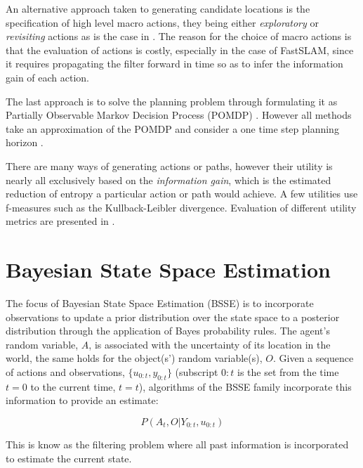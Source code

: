An alternative approach taken to generating candidate locations is the specification of high level macro actions, they being either 
\textit{exploratory} or \textit{revisiting} actions as is the case in \cite{stachniss05robotics}. The reason for the choice of macro actions is that the evaluation
of actions is costly, especially in the case of FastSLAM, since it requires propagating the filter 
forward in time so as to infer the information gain of each action.

The last approach is to solve the planning problem through formulating it as  Partially Observable Markov Decision Process (POMDP) \cite{Ross08onlineplanning}. 
However all methods take an approximation of the POMDP and consider a one time step planning horizon \cite[p.37]{GeorgiosLidoris}.

There are many ways of generating actions or paths, however their utility is nearly all exclusively based on the \textit{information gain}, 
which is the estimated reduction of entropy a particular action or path would achieve. A few utilities use f-measures such as the Kullback-Leibler divergence. 
Evaluation of different utility metrics are presented in \cite{Active_SLAM_Uncertainty_compar,tovar_planning,KL_SLAM_exploration_PF}.



\section{Bayesian State Space Estimation}\label{ch5:BSSE}

The focus of Bayesian State Space Estimation (BSSE) is to incorporate observations to update a prior distribution over
the state space to a posterior distribution through the application of Bayes probability rules. The agent's random variable, $A$, 
is associated with the uncertainty of its location in the world, the same holds for the object(s') random variable(s), $O$. 
Given a sequence of actions and observations, $\{u_{0:t},y_{0:t}\}$ (subscript $0:t$ is the set from the time $t=0$ to the current time, $t=t$), 
algorithms of the BSSE family incorporate this information to provide an estimate:

\begin{equation}
 P(A_t,O|Y_{0:t},u_{0:t}) 
 \label{eq:joint}
\end{equation}

This is know as the filtering problem where all past information is incorporated to estimate the current state.  

